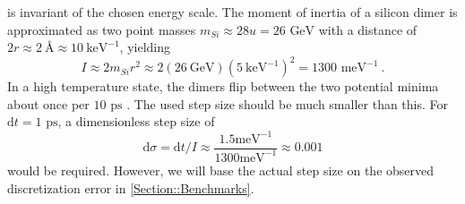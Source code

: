 	is invariant of the chosen energy scale. The moment of inertia of a silicon dimer is approximated as two point masses $m_{Si} \approx 28u =	26 \text{ GeV}$ with a distance of $2r \approx 2 ~\text{\AA} \approx 10~ \text{keV}^{-1}$, yielding
	\begin{equation}
		I \approx 2m_{Si} r^2 \approx	2 \left(26 ~\text{GeV}\right) \left(5 ~\text{keV}^{-1}\right)^2 =	1300 \text{ meV}^{-1}~.
	\end{equation}
	 In a high temperature state, the dimers flip between the two potential minima about once per $10 \text{ ps}$ \cite{dabrowski1992self}. The used step size should be much smaller than this. For $\text{d}t =	1 \text{ ps}$, a dimensionless step size of
	\begin{equation}
		\text{d} \sigma =	\text{d}t / I \approx \frac{1.5 \text{meV}^{-1}}{1300 \text{meV}^{-1}} \approx 0.001
	\end{equation}
	would be required. However, we will base the actual step size on the observed discretization error in \autoref{Section::Benchmarks}. 

